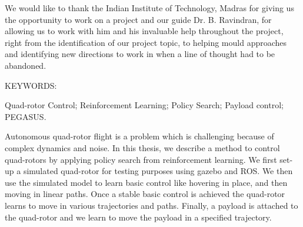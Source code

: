 \documentclass[BTech]{iitmdiss}
\begin{document}
\acknowledgements

We would like to thank the Indian Institute of Technology, Madras for giving us the opportunity to work on a project and our guide Dr. B. Ravindran, for allowing us to work with him and his invaluable help throughout the project, right from the identification of our project topic, to helping mould approaches and identifying new directions to work in when a line of thought had to be abandoned.



\abstract

\noindent KEYWORDS: \hspace*{0.5em} \parbox[t]{4.4in}{Quad-rotor Control; Reinforcement Learning; Policy Search; Payload control; PEGASUS.}

\vspace*{24pt}

\noindent Autonomous quad-rotor flight is a problem which is challenging because of complex dynamics and noise. In this thesis, we describe a method to control quad-rotors by applying policy search from reinforcement learning. We first set-up a simulated quad-rotor for testing purposes using gazebo and ROS. We then use the simulated model to learn basic control like hovering in place, and then moving in linear paths. Once a stable basic control is achieved the quad-rotor learns to move in various trajectories and paths. Finally, a payload is attached to the quad-rotor and we learn to move the payload in a specified trajectory.

\pagebreak


\begin{singlespace}
\tableofcontents
\thispagestyle{empty}

\listoftables
{}
\listoffigures
{}
\end{singlespace}



\end{document}
